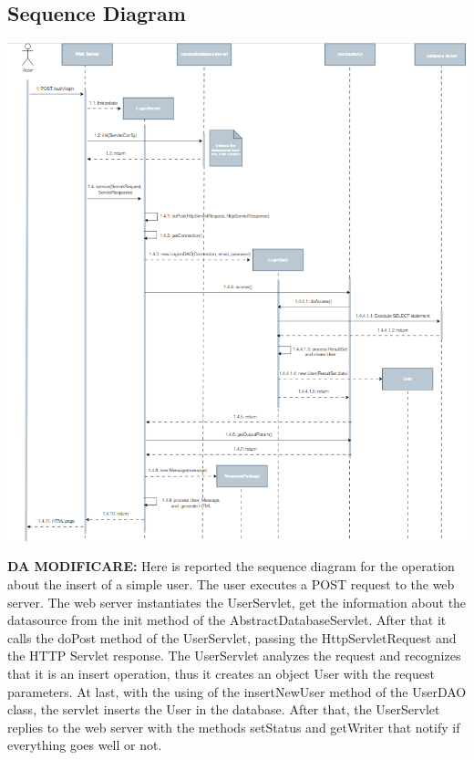 \subsection{Sequence Diagram}

\includegraphics[scale = 0.8]{sections/BLL/sequenceDiagram.png}

\textbf{DA MODIFICARE:}
Here is reported the sequence diagram for the operation about the insert of a simple user. The user
executes a POST request to the web server. The web server instantiates the UserServlet, get the
information about the datasource from the init method of the AbstractDatabaseServlet. After that it
calls the doPost method of the UserServlet, passing the HttpServletRequest and the HTTP Servlet
response. The UserServlet analyzes the request and recognizes that it is an insert operation, thus it
creates an object User with the request parameters. At last, with the using of the insertNewUser
method of the UserDAO class, the servlet inserts the User in the database. After that, the UserServlet
replies to the web server with the methods setStatus and getWriter that notify if everything goes well
or not.